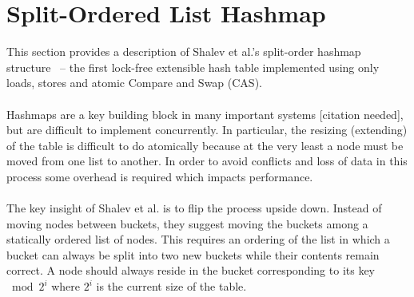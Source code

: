 \documentclass{uit-thesis}
\begin{document}
\section{Split-Ordered List Hashmap}\label{sec:hashmap}
This section provides a description of Shalev et al.'s split-order hashmap structure~\cite{Shalev2006} -- the first lock-free extensible hash table implemented using only loads, stores and atomic Compare and Swap (CAS).
\\\\
Hashmaps are a key building block in many important systems [citation needed], but are difficult to implement concurrently. In particular, the resizing (extending) of the table is difficult to do atomically because at the very least a node must be moved from one list to another. In order to avoid conflicts and loss of data in this process some overhead is required which impacts performance.
\\\\
The key insight of Shalev et al. is to flip the process upside down. Instead of moving nodes between buckets, they suggest moving the buckets among a statically ordered list of nodes. This requires an ordering of the list in which a bucket can always be split into two new buckets while their contents remain correct. A node should always reside in the bucket corresponding to its key $\bmod{2^i}$ where $2^i$ is the current size of the table.
\end{document}
